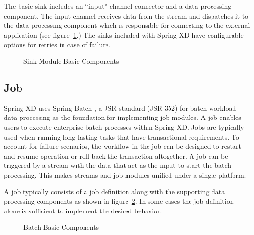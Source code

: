\par

The basic sink includes an ``input'' channel connector and a data processing
component. The input channel receives data from the stream and dispatches
it to the data processing component which is responsible for connecting to the external
application (see figure~\ref{fig:sinkmbc}.) The sinks included with Spring XD have
configurable options for retries in case of failure.

\par

\begin{figure}
\centering
{}
\caption{Sink Module Basic Components}
\label{fig:sinkmbc}
\end{figure}

\par

\subsection{Job}
\label{sec:Job}
Spring XD uses Spring Batch \cite{spring-batch-reference}, a JSR standard (JSR-352)
for batch workload data processing as the foundation for implementing
job modules. A job enables users to execute enterprise batch processes within Spring XD.
Jobs are typically used when running long lasting tasks that have transactional requirements.
To account for failure scenarios, the workflow in the job can be designed to restart and
resume operation or roll-back the transaction altogether. A job can be triggered by a
stream with the data that act as the input to start the batch processing. This makes
streams and job modules unified under a single platform.

\par

A job typically consists of a job definition along with the supporting
data processing components as shown in figure~\ref{fig:batchmbc}.
In some cases the job definition alone is sufficient to implement the desired behavior.

\par

\begin{figure}
\centering
{}
\caption{Batch Basic Components}
\label{fig:batchmbc}
\end{figure}

\par 

